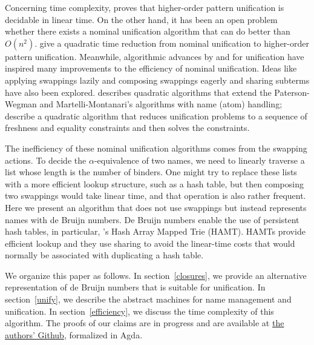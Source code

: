 \documentclass[a4paper,UKenglish]{lipics-v2016}
\begin{document}
Concerning time complexity, \citet{qian_unification_1996} proves that
higher-order pattern unification is decidable in linear time.  On the
other hand, it has been an open problem whether there exists a nominal
unification algorithm that can do better than
$O(n^2)$. \citet{levy_nominal_2012} give a quadratic time reduction
from nominal unification to higher-order pattern unification.
Meanwhile, algorithmic advances by \citet{paterson_linear_1978} and
\citet{martelli_efficient_1982} for unification have inspired many
improvements to the efficiency of nominal unification. Ideas
like applying swappings lazily and composing swappings eagerly and
sharing subterms have also been explored. \citet{calves_complexity_2010}
describes quadratic algorithms that extend the Paterson-Wegman and
Martelli-Montanari's algorithms with name (atom) handling;
\citet{levy_efficient_2010} describe a quadratic algorithm that
reduces unification problems to a sequence of freshness and equality
constraints and then solves the constraints.

The inefficiency of these nominal unification algorithms comes from
the swapping actions. To decide the $\alpha$-equivalence of
two names, we need to linearly traverse a list whose length 
is the number of binders.  One might try to replace these
lists with a more efficient lookup structure, such as a hash table,
but then composing two swappings would take linear time, and that
operation is also rather frequent.  Here we present an algorithm that
does not use swappings but instead represents names with de Bruijn
numbers. De Bruijn numbers enable the use of persistent hash tables, in
particular, \citeauthor{bagwell_ideal_2001}'s Hash Array Mapped Trie
(HAMT). HAMTs provide efficient lookup and
they use sharing to avoid the linear-time costs that would normally be
associated with duplicating a hash table.

We organize this paper as follows.  In section~\ref{closures}, we provide
an alternative representation of de Bruijn numbers that is suitable
for unification.  In section~\ref{unify}, we describe the abstract
machines for name management and unification.  In
section~\ref{efficiency}, we discuss the time complexity of this
algorithm. The proofs of our claims are in progress and are available
at \href{https://github.com/mvcccccc/UNIF2018}{the authors' Github},
formalized in Agda.
  
\end{document}
